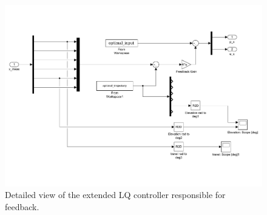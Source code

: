 \begin{figure}[!htb]
	\centering
	\includegraphics[trim=10 100 10 60, clip, width=\textwidth]{figures/simulink/ex4_feedback.pdf}
	\caption{Detailed view of the extended LQ controller responsible for feedback.}
\label{fig:sim_ex4_fb}
\end{figure}




